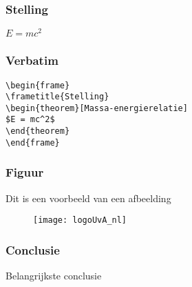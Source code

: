 \documentclass[aspectratio=169]{uva-inf-presentation}
\begin{document}

\begin{frame}
\frametitle{Stelling}
\begin{theorem}
$E = mc^2$
\end{theorem}
\end{frame}


\begin{frame}[fragile]
\frametitle{Verbatim}
\begin{example}
\begin{verbatim}
\begin{frame}
\frametitle{Stelling}
\begin{theorem}[Massa-energierelatie]
$E = mc^2$
\end{theorem}
\end{frame}\end{verbatim}
\end{example}
\end{frame}


\begin{frame}
\frametitle{Figuur}
Dit is een voorbeeld van een afbeelding
\begin{figure}
\texttt{[image: logoUvA\_nl]}
\end{figure}
\end{frame}


\begin{frame}
\frametitle{Conclusie}
\Large{\centerline{Belangrijkste conclusie}}
\end{frame}
\end{document}
